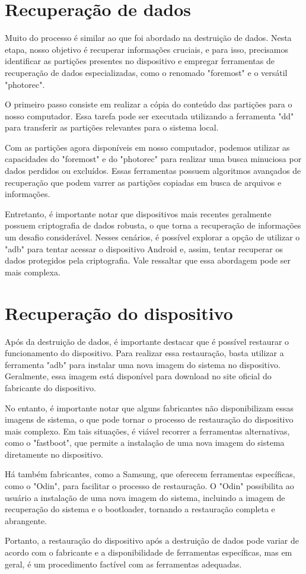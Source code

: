 \newpage

\section{Recuperação de dados}

Muito do processo é similar ao que foi abordado na destruição de dados. Nesta etapa, nosso objetivo é recuperar informações cruciais, e para isso, precisamos identificar as partições presentes no dispositivo e empregar ferramentas de recuperação de dados especializadas, como o renomado "foremost" e o versátil "photorec".

O primeiro passo consiste em realizar a cópia do conteúdo das partições para o nosso computador. Essa tarefa pode ser executada utilizando a ferramenta "dd" para transferir as partições relevantes para o sistema local.

Com as partições agora disponíveis em nosso computador, podemos utilizar as capacidades do "foremost" e do "photorec" para realizar uma busca minuciosa por dados perdidos ou excluídos. Essas ferramentas possuem algoritmos avançados de recuperação que podem varrer as partições copiadas em busca de arquivos e informações.

Entretanto, é importante notar que dispositivos mais recentes geralmente possuem criptografia de dados robusta, o que torna a recuperação de informações um desafio considerável. Nesses cenários, é possível explorar a opção de utilizar o "adb" para tentar acessar o dispositivo Android e, assim, tentar recuperar os dados protegidos pela criptografia. Vale ressaltar que essa abordagem pode ser mais complexa.

\section{Recuperação do dispositivo}

Após da destruição de dados, é importante destacar que é possível restaurar o funcionamento do dispositivo. Para realizar essa restauração, basta utilizar a ferramenta "adb" para instalar uma nova imagem do sistema no dispositivo. Geralmente, essa imagem está disponível para download no site oficial do fabricante do dispositivo.

No entanto, é importante notar que alguns fabricantes não disponibilizam essas imagens de sistema, o que pode tornar o processo de restauração do dispositivo mais complexo. Em tais situações, é viável recorrer a ferramentas alternativas, como o "fastboot", que permite a instalação de uma nova imagem do sistema diretamente no dispositivo.

Há também fabricantes, como a Samsung, que oferecem ferramentas específicas, como o "Odin", para facilitar o processo de restauração. O "Odin" possibilita ao usuário a instalação de uma nova imagem do sistema, incluindo a imagem de recuperação do sistema e o bootloader, tornando a restauração completa e abrangente.

Portanto, a restauração do dispositivo após a destruição de dados pode variar de acordo com o fabricante e a disponibilidade de ferramentas específicas, mas em geral, é um procedimento factível com as ferramentas adequadas.